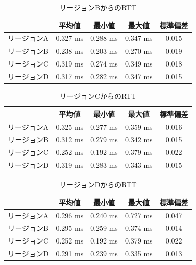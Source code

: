 \begin{table}[htb]
  \centering
  \caption{リージョンBからのRTT}
  \begin{tabular}{|c||c|c|c|c|} \hline
    \backslashbox{}{} & 平均値 & 最小値 & 最大値 & 標準偏差 \\ \hline \hline
    リージョンA & 0.327 ms & 0.288 ms & 0.347 ms & 0.015 \\ \hline
    リージョンB & 0.238 ms & 0.203 ms & 0.270 ms & 0.019 \\ \hline
    リージョンC & 0.319 ms & 0.274 ms & 0.349 ms & 0.018 \\ \hline
    リージョンD & 0.317 ms & 0.282 ms & 0.347 ms & 0.015 \\ \hline
  \end{tabular}
  \label{tab:ping_regionB}
\end{table}

\begin{table}[htb]
  \centering
  \caption{リージョンCからのRTT}
  \begin{tabular}{|c||c|c|c|c|} \hline
    \backslashbox{}{} & 平均値 & 最小値 & 最大値 & 標準偏差 \\ \hline \hline
    リージョンA & 0.325 ms & 0.277 ms & 0.359 ms & 0.016 \\ \hline
    リージョンB & 0.312 ms & 0.279 ms & 0.342 ms & 0.015 \\ \hline
    リージョンC & 0.252 ms & 0.192 ms & 0.379 ms & 0.022 \\ \hline
    リージョンD & 0.319 ms & 0.283 ms & 0.343 ms & 0.015 \\ \hline
  \end{tabular}
  \label{tab:ping_regionC}
\end{table}

\begin{table}[htb]
  \centering
  \caption{リージョンDからのRTT}
  \begin{tabular}{|c||c|c|c|c|} \hline
    \backslashbox{}{} & 平均値 & 最小値 & 最大値 & 標準偏差 \\ \hline \hline
    リージョンA & 0.296 ms & 0.240 ms & 0.727 ms & 0.047 \\ \hline
    リージョンB & 0.295 ms & 0.259 ms & 0.374 ms & 0.014 \\ \hline
    リージョンC & 0.252 ms & 0.192 ms & 0.379 ms & 0.022 \\ \hline
    リージョンD & 0.291 ms & 0.239 ms & 0.335 ms & 0.013 \\ \hline
  \end{tabular}
  \label{tab:ping_regionD}
\end{table}

